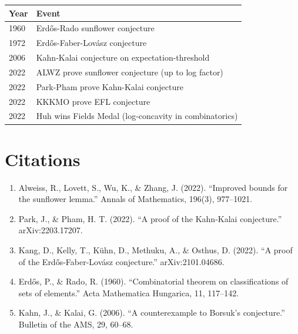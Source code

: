 \begin{tabularx}{\linewidth}{lX}
\toprule
\textbf{Year} & \textbf{Event} \\ \midrule
1960 & Erd\H{o}s-Rado sunflower conjecture \\
1972 & Erd\H{o}s-Faber-Lov\'{a}sz conjecture \\
2006 & Kahn-Kalai conjecture on expectation-threshold \\
2022 & ALWZ prove sunflower conjecture (up to log factor) \\
2022 & Park-Pham prove Kahn-Kalai conjecture \\
2022 & KKKMO prove EFL conjecture \\
2022 & Huh wins Fields Medal (log-concavity in combinatorics) \\
\bottomrule
\end{tabularx}

\section{Citations}

\begin{enumerate}
\item Alweiss, R., Lovett, S., Wu, K., \& Zhang, J. (2022). ``Improved bounds for the sunflower lemma.'' Annals of Mathematics, 196(3), 977--1021.
\item Park, J., \& Pham, H. T. (2022). ``A proof of the Kahn-Kalai conjecture.'' arXiv:2203.17207.
\item Kang, D., Kelly, T., K\"{u}hn, D., Methuku, A., \& Osthus, D. (2022). ``A proof of the Erd\H{o}s-Faber-Lov\'{a}sz conjecture.'' arXiv:2101.04686.
\item Erd\H{o}s, P., \& Rado, R. (1960). ``Combinatorial theorem on classifications of sets of elements.'' Acta Mathematica Hungarica, 11, 117--142.
\item Kahn, J., \& Kalai, G. (2006). ``A counterexample to Borsuk's conjecture.'' Bulletin of the AMS, 29, 60--68.
\end{enumerate}
